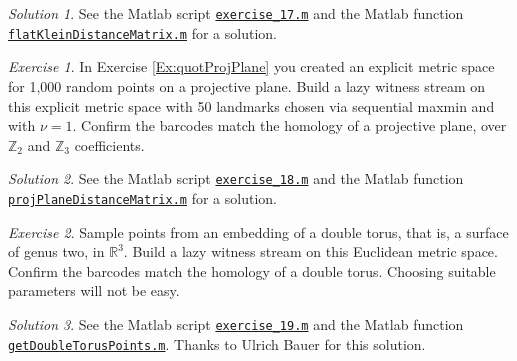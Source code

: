 \documentclass[amscd, amssymb, verbatim]{amsart}[12pt]
\theoremstyle{remark}
\theoremstyle{remark}
\newtheorem{exerciseSol}{Exercise}
\theoremstyle{remark}
\newtheorem*{solution}{Solution}
\begin{document}
\begin{solution}
See the Matlab script \href{https://github.com/appliedtopology/javaplex/tree/master/src/matlab/for_distribution/tutorial_solutions/exercise_17.m}{\texttt{exercise\_17.m}} and the Matlab function \href{https://github.com/appliedtopology/javaplex/tree/master/src/matlab/for_distribution/tutorial_solutions/flatKleinDistanceMatrix.m}{\texttt{flatKleinDistanceMatrix.m}} for a solution.
\end{solution}

\begin{exerciseSol}
In Exercise \ref{Ex:quotProjPlane} you created an explicit metric space for 1,000 random points on a projective plane. Build a lazy witness stream on this explicit metric space with 50 landmarks chosen via sequential maxmin and with $\nu = 1$.  Confirm the barcodes match the homology of a projective plane, over $\mathbb{Z}_2$ and $\mathbb{Z}_3$ coefficients.
\end{exerciseSol}

\begin{solution}
See the Matlab script \href{https://github.com/appliedtopology/javaplex/tree/master/src/matlab/for_distribution/tutorial_solutions/exercise_18.m}{\texttt{exercise\_18.m}} and the Matlab function \href{https://github.com/appliedtopology/javaplex/tree/master/src/matlab/for_distribution/tutorial_solutions/projPlaneDistanceMatrix.m}{\texttt{projPlaneDistanceMatrix.m}} for a solution.
\end{solution}

\begin{exerciseSol}
Sample points from an embedding of a double torus, that is, a surface of genus two, in $\mathbb{R}^3$. Build a lazy witness stream on this Euclidean metric space. Confirm the barcodes match the homology of a double torus. Choosing suitable parameters will not be easy.
\end{exerciseSol}

\begin{solution}
See the Matlab script \href{https://github.com/appliedtopology/javaplex/tree/master/src/matlab/for_distribution/tutorial_solutions/exercise_19.m}{\texttt{exercise\_19.m}} and the Matlab function \href{https://github.com/appliedtopology/javaplex/tree/master/src/matlab/for_distribution/tutorial_solutions/getDoubleTorusPoints.m}{\texttt{getDoubleTorusPoints.m}}. Thanks to Ulrich Bauer for this solution.
\end{solution}





\end{document}
